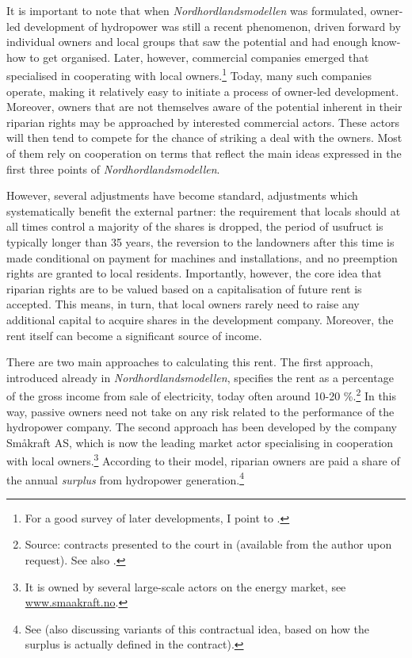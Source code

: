 It is important to note that when {\it Nordhordlandsmodellen} was formulated, owner-led development of hydropower was still a recent phenomenon, driven forward by individual owners and local groups that saw the potential and had enough know-how to get organised. Later, however, commercial companies emerged that specialised in cooperating with local owners.\footnote{For a good survey of later developments, I point to \cite{larsen06,larsen08,larsen12}.} Today, many such companies operate, making it relatively easy to initiate a process of owner-led development. Moreover, owners that are not themselves aware of the potential inherent in their riparian rights may be approached by interested commercial actors. These actors will then tend to compete for the chance of striking a deal with the owners. Most of them rely on cooperation on terms that reflect the main ideas expressed in the first three points of {\it Nordhordlandsmodellen}.

However, several adjustments have become standard, adjustments which systematically benefit the external partner: the requirement that locals should at all times control a majority of the shares is dropped, the period of usufruct is typically longer than 35 years, the reversion to the landowners after this time is made conditional on payment for machines and installations, and no preemption rights are granted to local residents. Importantly, however, the core idea that riparian rights are to be valued based on a capitalisation of future rent is accepted. This means, in turn, that local owners rarely need to raise any additional capital to acquire shares in the development company. Moreover, the rent itself can become a significant source of income.

There are two main approaches to calculating this rent. The first approach, introduced already in {\it Nordhordlandsmodellen}, specifies the rent as a percentage of the gross income from sale of electricity, today often around 10-20 \%.\footnote{Source: contracts presented to the court in \cite{sauda09} (available from the author upon request). See also \cite[55-57]{hauge15}.} In this way, passive owners need not take on any risk related to the performance of the hydropower company. The second approach has been developed by the company Småkraft AS, which is now the leading market actor specialising in cooperation with local owners.\footnote{It is owned by several large-scale actors on the energy market, see \url{www.smaakraft.no}.} According to their model, riparian owners are paid a share of the annual {\it surplus} from hydropower generation.\footnote{See \cite[57-60]{hauge15} (also discussing variants of this contractual idea, based on how the surplus is actually defined in the contract).}

